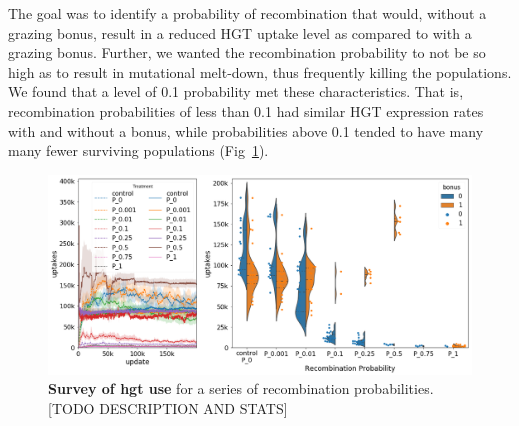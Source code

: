 \documentclass[PhD]{msu-thesis}
\begin{document}
\begin{appendices}
The goal was to identify a probability of recombination that would, without a grazing bonus, result in a reduced HGT uptake level as compared to with a grazing bonus. Further, we wanted the recombination probability to not be so high as to result in mutational melt-down, thus frequently killing the populations. We found that a level of 0.1 probability met these characteristics. That is, recombination probabilities of less than 0.1 had similar HGT expression rates with and without a bonus, while probabilities above 0.1 tended to have many many fewer surviving populations (Fig~\ref{fig:a2-hgt-probabilitysweep-hgtuse}).

	\begin{figure}[!h]
	\includegraphics[trim={0 0 0 0}, clip, width=0.85\columnwidth]{figures/A2/hgt-probabilitysweep-hgtuse.png}
	\caption{\textbf{Survey of hgt use} for a series of recombination probabilities. [TODO DESCRIPTION AND STATS]%
	}
	\label{fig:a2-hgt-probabilitysweep-hgtuse}
	\end{figure}



\end{appendices}
\end{document}
